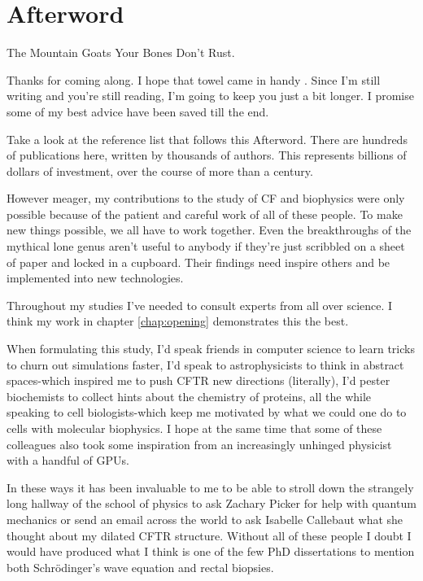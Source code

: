 \chapter{Afterword}
\label{chap:Afterword}
\begin{chapquote} {The Mountain Goats \cite{bones_dont_rust}}
Your Bones Don't Rust.
\end{chapquote}
Thanks for coming along. I hope that towel came in handy \cite{adams1979}. Since I'm still writing and you're still reading, I'm going to keep you just a bit longer. I promise some of my best advice have been saved till the end. 

Take a look at the reference list that follows this Afterword. There are hundreds of publications here, written by thousands of authors. This represents billions of dollars of investment, over the course of more than a century. 

However meager, my contributions to the study of CF and biophysics were only possible because of the patient and careful work of all of these people. To make new things possible, we all have to work together. Even the breakthroughs of the mythical lone genus aren't useful to anybody if they're just scribbled on a sheet of paper and locked in a cupboard. Their findings need inspire others and be implemented into new technologies.

Throughout my studies I've needed to consult experts from all over science. I think my work in chapter \ref{chap:opening} demonstrates this the best. 

When formulating this study, I'd speak friends in computer science to learn tricks to churn out simulations faster, I'd speak to astrophysicists to think in abstract spaces-which inspired me to push CFTR new directions (literally), I'd pester biochemists to collect hints about the chemistry of proteins, all the while speaking to cell biologists-which keep me motivated by what we could one do to cells with molecular biophysics. I hope at the same time that some of these colleagues also took some inspiration from an increasingly unhinged physicist with a handful of GPUs. 

In these ways it has been invaluable to me to be able to stroll down the strangely long hallway of the school of physics to ask Zachary Picker for help with quantum mechanics or send an email across the world to ask Isabelle Callebaut what she thought about my dilated CFTR structure. Without all of these people I doubt I would have produced what I think is one of the few PhD dissertations to mention both Schr\"odinger's wave equation and rectal biopsies. 

